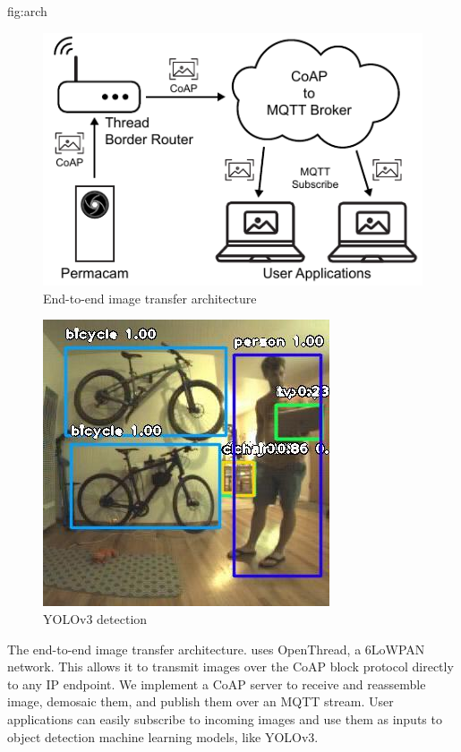 \begin{definefigure}{fig:arch}
    \centering
    \begin{subfigure}{0.6\columnwidth}
        \centering
        \includegraphics[width=\textwidth]{figs/permacam/figs/arch}
        \caption{End-to-end image transfer architecture}
        \label{fig:arch:arch}
    \end{subfigure}
    \begin{subfigure}{0.39\columnwidth}
        \centering
        \includegraphics[width=\textwidth]{figs/permacam/detection_90_59158.jpeg}
        \caption{\scriptsize{YOLOv3 detection}}
        \label{fig:arch:yolo_image}
    \end{subfigure}
\caption{The \namec end-to-end image transfer architecture. \namec uses OpenThread, a 6LoWPAN network. This allows it to transmit images over the CoAP block protocol directly to any IP endpoint. 
We implement a CoAP server to receive and reassemble image, demosaic them, and publish them over an MQTT stream. 
User applications can easily subscribe to incoming images and use them as inputs to object detection machine learning models, like YOLOv3. 
}
\end{definefigure}

